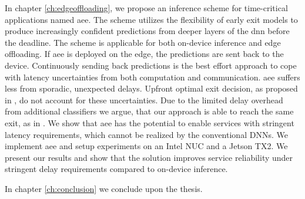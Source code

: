 In chapter \ref{ch:edgeoffloading}, we propose an inference scheme for time-critical applications named \acrfull{aee}. The scheme utilizes the flexibility of early exit models to produce increasingly confident predictions from deeper layers of the \gls{dnn} before the deadline. The scheme is applicable for both on-device inference and edge offloading. If \gls{aee} is deployed on the edge, the predictions are sent back to the device. Continuously sending back predictions is the best effort approach to cope with latency uncertainties from both computation and communication. \gls{aee} suffers less from sporadic, unexpected delays. Upfront optimal exit decision, as proposed in \cite{li_edge_2018}, do not account for these uncertainties. Due to the limited delay overhead from additional classifiers we argue, that our approach is able to reach the same exit, as in \cite{li_edge_2018}. We show that \gls{aee} has the potential to enable services with stringent latency requirements, which cannot be realized by the conventional DNNs. We implement \gls{aee} and setup experiments on an Intel NUC and a Jetson TX2. We present our results and show that the solution improves service reliability under stringent delay requirements compared to on-device inference.

In chapter \ref{ch:conclusion} we conclude upon the thesis.

